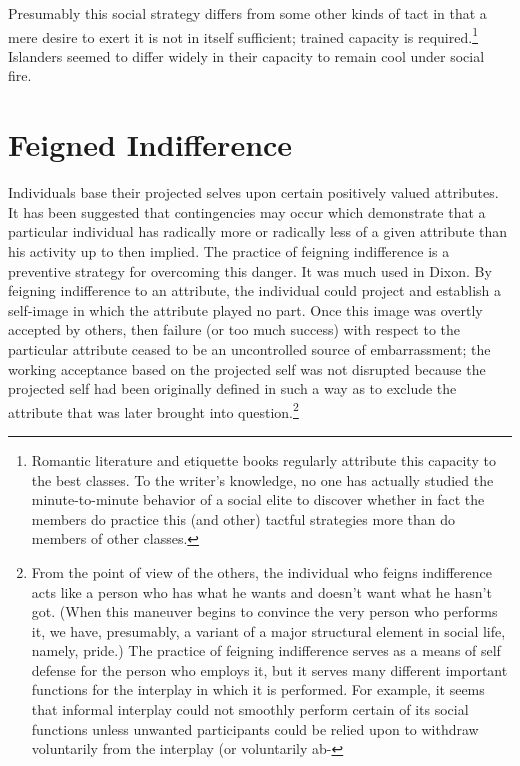 \documentclass[openany,nobib]{tufte-book}
\begin{document}
\noindent Presumably this social strategy differs from some other kinds of tact in
that a mere desire to exert it is not in itself sufficient; trained
capacity is required.\footnote{Romantic literature and etiquette books
  regularly attribute this capacity to the best classes. To the writer's
  knowledge, no one has actually studied the minute-to-minute behavior
  of a social elite to discover whether in fact the members do practice
  this (and other) tactful strategies more than do members of other
  classes.} Islanders seemed to differ widely in their capacity to
remain cool under social fire.

\hypertarget{feigned-indifference}{%
\section{Feigned Indifference}\label{feigned-indifference}}

Individuals base their projected selves upon certain positively valued
attributes. It has been suggested that contingencies may occur which
demonstrate that a particular individual has radically more or radically
less of a given attribute than his activity up to then implied. The
practice of feigning indifference is a preventive strategy for
overcoming this danger. It was much used in Dixon. By feigning
indifference to an attribute, the individual could project and establish
a self-image in which the attribute played no part. Once this image was
overtly accepted by others, then failure (or too much success) with
respect to the particular attribute ceased to be an uncontrolled source
of embarrassment; the working acceptance based on the projected self was
not disrupted because the projected self had been originally defined in
such a way as to exclude the attribute that was later brought into
question.\footnote{From the point of view of the others, the individual
  who feigns indifference acts like a person who has what he wants and
  doesn't want what he hasn't got. (When this maneuver begins to
  convince the very person who performs it, we have, presumably, a
  variant of a major structural element in social life, namely, pride.)
  The practice of feigning indifference serves as a means of self
  defense for the person who employs it, but it serves many different
  important functions for the interplay in which it is performed. For
  example, it seems that informal interplay could not smoothly perform
  certain of its social functions unless unwanted participants could be
  relied upon to withdraw voluntarily from the interplay (or voluntarily ab-}
\end{document}
